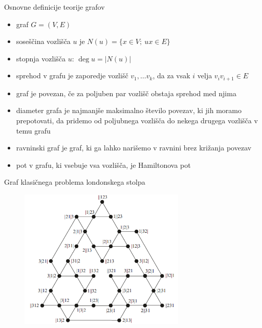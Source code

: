 \documentclass{beamer}
\DeclareMathOperator {\stopnja} {deg}
\begin{document}
\begin{frame}{Osnovne definicije teorije grafov}
    \begin{itemize}
        \item graf $ G = (V, E) $
        \item \alert{soseščina} vozlišča $u$ je $N(u) = \{x \in V;\ ux \in E\}$
        \item \alert{stopnja} vozlišča $u$: $\stopnja u  = \lvert N(u) \rvert$
        \item \alert{sprehod} v grafu je zaporedje vozlišč $v_1,\ldots v_k$, da za vsak $i$ velja $v_i v_{i+1} \in E$
        \item graf je \alert{povezan}, če za poljuben par vozlišč obstaja sprehod med njima
        \item \alert{diameter} grafa je najmanjše maksimalno število povezav, ki jih moramo prepotovati, da pridemo od poljubnega vozlišča do nekega drugega vozlišča v temu grafu
    \end{itemize}
\end{frame}

\begin{frame}
    \begin{itemize}
        \item \alert{ravninski} graf je graf, ki ga lahko narišemo v ravnini brez križanja povezav
        \item pot v grafu, ki vsebuje vsa vozlišča, je \alert{Hamiltonova pot}
    \end{itemize}
\end{frame}

\begin{frame}{Graf klasičnega problema londonskega stolpa}
    
    \begin{figure}
        \centering
        \includegraphics[height=190pt]{img/tolgraph.png}
    \end{figure}
\end{frame}
\end{document}
